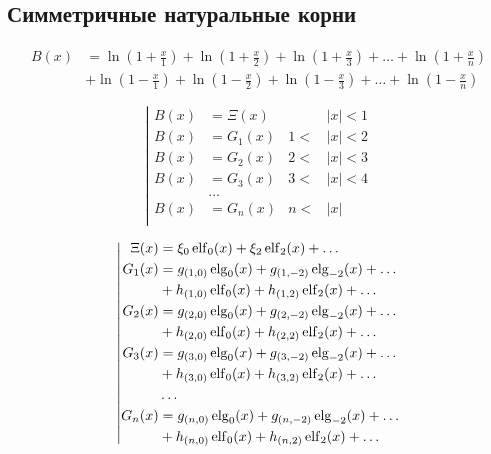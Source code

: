 
\subsection{Симметричные натуральные корни}

\begin{equation*} \begin{aligned}
B(x) &=
  \ln{\left(1 + \frac{x}{1} \right)}
+ \ln{\left(1 + \frac{x}{2} \right)}
+ \ln{\left(1 + \frac{x}{3} \right)}
+ \ldots
+ \ln{\left(1 + \frac{x}{n} \right)} \\ &
+ \ln{\left(1 - \frac{x}{1} \right)}
+ \ln{\left(1 - \frac{x}{2} \right)}
+ \ln{\left(1 - \frac{x}{3} \right)}
+ \ldots
+ \ln{\left(1 - \frac{x}{n} \right)}
\end{aligned} \end{equation*}

\begin{equation*} \left| \begin{aligned}
B(x) &= \Xi(x) & 
&|x| < 1 \\
%
B(x) &= G_1(x) & 
1 < &|x| < 2 \\
%
B(x) &= G_2(x) & 
2 < &|x| < 3 \\
%
B(x) &= G_3(x) &
3 < &|x| < 4 \\
&\ldots & & \\
%
B(x) &= G_n(x) &
n < &|x| \\
\end{aligned} \right. \end{equation*}

\begin{equation*} \left| \begin{aligned}
\Xi(x) &=
  \xi_0 \elf_0(x)
+ \xi_2 \elf_2(x) 
+ \ldots \\
%
G_1(x) &=
  g_{(1,0)} \elg_0(x) 
+ g_{(1,-2)} \elg_{-2}(x)
+ \ldots \\ &
+ h_{(1,0)} \elf_0(x)
+ h_{(1,2)} \elf_2(x)
+ \ldots \\
%
G_2(x) &=
  g_{(2,0)} \elg_0(x) 
+ g_{(2,-2)} \elg_{-2}(x)
+ \ldots \\ &
+ h_{(2,0)} \elf_0(x)
+ h_{(2,2)} \elf_2(x)
+ \ldots \\
%
G_3(x) &=
  g_{(3,0)} \elg_0(x) 
+ g_{(3,-2)} \elg_{-2}(x)
+ \ldots \\ &
+ h_{(3,0)} \elf_0(x)
+ h_{(3,2)} \elf_2(x)
+ \ldots \\
%
&\ldots \\
%
G_n(x) &=
  g_{(n,0)} \elg_0(x) 
+ g_{(n,-2)} \elg_{-2}(x)
+ \ldots \\ &
+ h_{(n,0)} \elf_0(x)
+ h_{(n,2)} \elf_2(x)
+ \ldots \\
\end{aligned} \right. \end{equation*}

